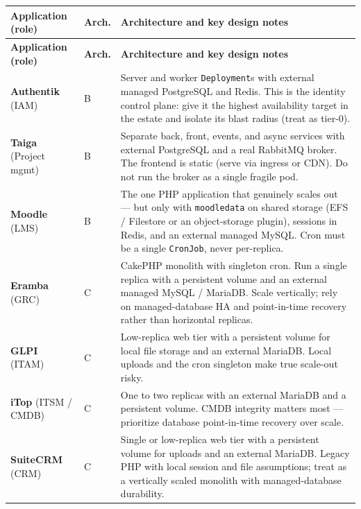 \documentclass[10pt,letterpaper]{article}
\newcommand{\tool}[1]{\textbf{#1}}
\begin{document}
\small
\begin{longtable}{L{1.15in} C{0.5in} L{4.9in}}
\toprule
\textbf{Application (role)} & \textbf{Arch.} & \textbf{Architecture and key design notes} \\
\midrule
\endfirsthead
\toprule
\textbf{Application (role)} & \textbf{Arch.} & \textbf{Architecture and key design notes} \\
\midrule
\endhead
\bottomrule
\endfoot
\tool{Authentik} \newline (IAM) & B & Server and worker \texttt{Deployment}s with external managed PostgreSQL and Redis. This is the identity control plane: give it the highest availability target in the estate and isolate its blast radius (treat as tier-0). \\
\tool{Taiga} \newline (Project mgmt) & B & Separate back, front, events, and async services with external PostgreSQL and a real RabbitMQ broker. The frontend is static (serve via ingress or CDN). Do not run the broker as a single fragile pod. \\
\tool{Moodle} \newline (LMS) & B & The one PHP application that genuinely scales out --- but only with \texttt{moodledata} on shared storage (EFS / Filestore or an object-storage plugin), sessions in Redis, and an external managed MySQL. Cron must be a single \texttt{CronJob}, never per-replica. \\
\tool{Eramba} \newline (GRC) & C & CakePHP monolith with singleton cron. Run a single replica with a persistent volume and an external managed MySQL / MariaDB. Scale vertically; rely on managed-database HA and point-in-time recovery rather than horizontal replicas. \\
\tool{GLPI} \newline (ITAM) & C & Low-replica web tier with a persistent volume for local file storage and an external MariaDB. Local uploads and the cron singleton make true scale-out risky. \\
\tool{iTop} \newline (ITSM / CMDB) & C & One to two replicas with an external MariaDB and a persistent volume. CMDB integrity matters most --- prioritize database point-in-time recovery over scale. \\
\tool{SuiteCRM} \newline (CRM) & C & Single or low-replica web tier with a persistent volume for uploads and an external MariaDB. Legacy PHP with local session and file assumptions; treat as a vertically scaled monolith with managed-database durability. \\

\end{longtable}
\end{document}

